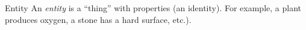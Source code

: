 \begin{definition}{Entity} An \emph{entity} is a ``thing'' with properties (an identity). For example, a plant produces oxygen, a stone has a hard surface, etc.).\end{definition}